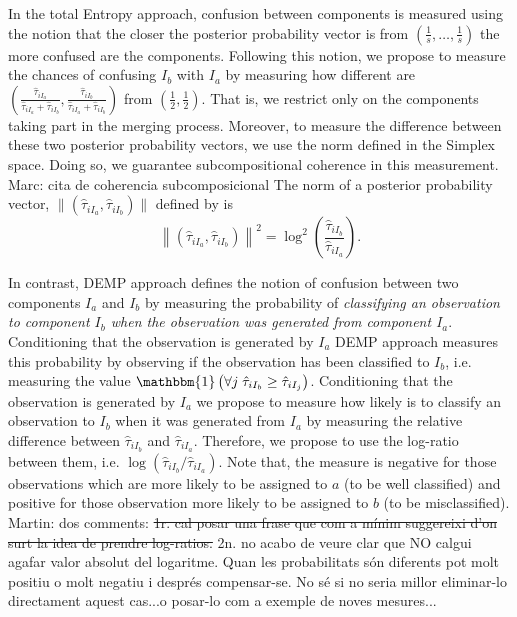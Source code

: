 \documentclass[10pt, a4paper]{article}
\begin{document}
\begin{spacing}{1.9}
In the total Entropy approach, confusion between components is measured using the notion that the closer the posterior probability vector is from $(\frac{1}{s}, \dots, \frac{1}{s})$ the more confused are the components. Following this notion, we propose to measure the chances of confusing $I_b$ with $I_a$  by measuring how different are $(\frac{\hat{\tau}_{i I_a}}{\hat{\tau}_{i I_a} + \hat{\tau}_{i I_b}}, \frac{\hat{\tau}_{i I_b}}{\hat{\tau}_{i I_a} + \hat{\tau}_{i I_b}})$ from $(\frac{1}{2}, \frac{1}{2})$. That is, we restrict only on the components taking part in the merging process. Moreover, to measure the difference between these two posterior probability vectors, we use the norm defined in the Simplex space. Doing so, we guarantee subcompositional coherence in this measurement. {\color{blue} Marc: cita de coherencia subcomposicional} The norm of a posterior probability vector, $\| (\hat{\tau}_{iI_a}, \hat{\tau}_{iI_b}) \|$  defined by \cite{aitchison2002simplicial} is \[ \left\| (\hat{\tau}_{iI_a}, \hat{\tau}_{iI_b}) \right\|^2 = \log^2 \left(\frac{ \hat{\tau}_{iI_b} }{ \hat{\tau}_{iI_a} }\right). \] 

In contrast, DEMP approach defines the notion of confusion between two components $I_a$ and $I_b$ by measuring the probability of \emph{classifying an observation to component $I_b$ when the observation was generated from component $I_a$}. Conditioning that the observation is generated by $I_a$ DEMP approach measures this probability by observing if the observation has been classified to $I_b$, i.e.  measuring the value $\mathbbm{1}\left( \forall j\; \hat{\tau}_{i I_{b}} \geq \hat{\tau}_{i I_j} \right)$. Conditioning that the observation is generated by $I_a$ we propose to measure how likely is to classify an observation to $I_b$ when it was generated from $I_a$ by measuring the relative difference between $\hat{\tau}_{i I_b}$ and $\hat{\tau}_{i I_a}$. Therefore, we propose to use the log-ratio between them, i.e.  $\log( \hat{\tau}_{i I_b}/\hat{\tau}_{i I_a})$. Note that, the measure is negative for those observations which are more likely to be assigned to $a$ (to be well classified) and positive for those observation more likely to be assigned to $b$ (to be misclassified). {\color{blue} Martin: dos comments: \sout{1r. cal posar una frase que com a mínim suggereixi d'on surt la idea de prendre log-ratios.} 2n. no acabo de veure clar que NO calgui agafar valor absolut del logaritme. Quan  les probabilitats són diferents pot molt positiu o molt negatiu i després compensar-se. No sé si no seria millor eliminar-lo directament aquest cas...o posar-lo com a exemple de noves mesures...}


\end{spacing}
\end{document}
